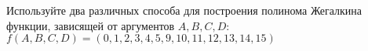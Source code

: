 \question Используйте два различных способа для построения полинома Жегалкина функции, зависящей от аргументов $A, B, C, D$:
$f(A,B,C,D) = (0,1,2,3,4,5,9,10,11,12,13,14,15)$
